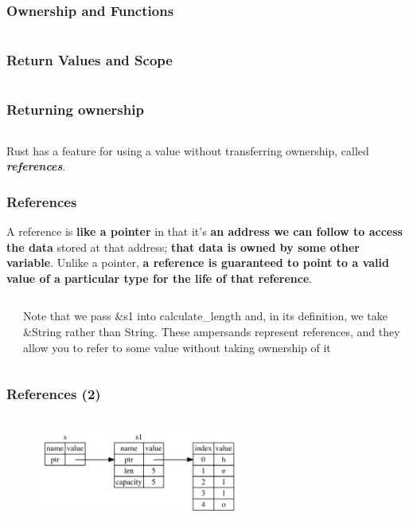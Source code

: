 \documentclass{beamer}
\begin{document}
\begin{frame}[fragile]
	\frametitle{Ownership and Functions}
	\inputminted[fontsize=\scriptsize]{rust}{./code/ownership-functions.rs}
\end{frame}

\begin{frame}[fragile]
	\frametitle{Return Values and Scope}
	\inputminted[fontsize=\scriptsize]{rust}{./code/ownership-return.rs}
\end{frame}

\begin{frame}[fragile]
	\frametitle{Returning ownership}
	\inputminted{rust}{./code/ownership-return2.rs}
	Rust has a feature for using a value without transferring ownership, called \textbf{\textit{references}}.
\end{frame}

\begin{frame}[fragile]
	\frametitle{References}
	A reference is\textbf{ like a pointer} in that it’s \textbf{an address we can follow to access the data} stored at that address; \textbf{that data is owned by some other variable}. Unlike a pointer,\textbf{ a reference is guaranteed to point to a valid value of a particular type for the life of that reference}.
	\begin{columns}
		\inputminted[fontsize=\scriptsize]{rust}{./code/references.rs}
		\small
		Note that we pass \&s1 into calculate\_length and, in its definition, we take \&String rather than String. These ampersands represent references, and they allow you to refer to some value without taking ownership of it
	\end{columns}
	
\end{frame}

\begin{frame}[fragile]
	\frametitle{References (2)}
	\inputminted[fontsize=\scriptsize]{rust}{./code/references.rs}
	\begin{figure}
		\centering
		\includegraphics[width=0.6\textwidth]{./img/trpl04-05.png}
		\label{fig:figureRef}
	\end{figure}
\end{frame}
\end{document}
